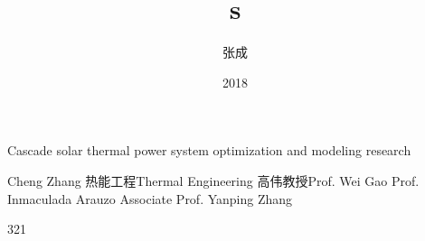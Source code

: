 \makenomenclature

\title{s}{Cascade solar thermal power system optimization and modeling research}
\author
{张成}{Cheng Zhang}
\major
{热能工程}{Thermal Engineering}
\supervisor
{高伟\hspace{0.2em}教授}{Prof. Wei Gao \newline Prof. Inmaculada Arauzo \newline Associate Prof. Yanping Zhang}
\date{2018}{3}{21}
